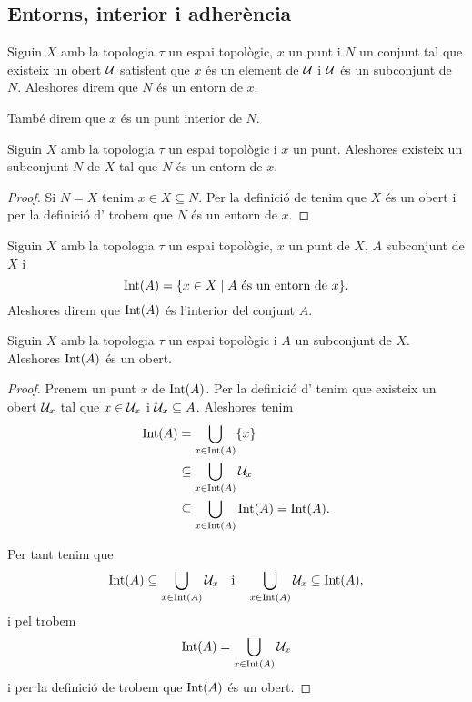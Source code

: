 \documentclass[../Apunts.tex]{subfiles}
\begin{document}
	\subsection{Entorns, interior i adherència}
	\begin{definition}[Entorn]
		\label{def:entorn}
		\label{def:punt interior}
		Siguin \(X\) amb la topologia \(\tau\) un espai topològic, \(x\) un punt i \(N\) un conjunt tal que existeix un obert \(\mathcal{U}\) satisfent que \(x\) és un element de \(\mathcal{U}\) i \(\mathcal{U}\) és un subconjunt de \(N\). Aleshores direm que \(N\) és un entorn de \(x\).
		
		També direm que \(x\) és un punt interior de \(N\).
	\end{definition}
	\begin{observation}
		\label{obs:tot punt té un entorn}
		Siguin \(X\) amb la topologia \(\tau\) un espai topològic i \(x\) un punt. Aleshores existeix un subconjunt \(N\) de \(X\) tal que \(N\) és un entorn de \(x\).
		\begin{proof}
			Si \(N=X\) tenim \(x\in X\subseteq N\). Per la definició de  tenim que \(X\) és un obert i per la definició d' trobem que \(N\) és un entorn de \(x\).
		\end{proof}
	\end{observation}
	\begin{definition}[Interior]
		\label{def:interior}
		Siguin \(X\) amb la topologia \(\tau\) un espai topològic, \(x\) un punt de \(X\), \(A\) subconjunt de \(X\) i
		\[\operatorname{Int}(A)=\{x\in X\mid A\text{ és un entorn de }x\}.\]
		Aleshores direm que \(\operatorname{Int}(A)\) és l'interior del conjunt \(A\).
	\end{definition}
	\begin{proposition}
		\label{prop:l'interior d'un conjunt és un obert}
		Siguin \(X\) amb la topologia \(\tau\) un espai topològic i \(A\) un subconjunt de \(X\). Aleshores \(\operatorname{Int}(A)\) és un obert.
		\begin{proof}
			Prenem un punt \(x\) de \(\operatorname{Int}(A)\). Per la definició d' tenim que existeix un obert \(\mathcal{U}_{x}\) tal que \(x\in\mathcal{U}_{x}\) i \(\mathcal{U}_{x}\subseteq A\). Aleshores tenim
			\begin{align*}
				\operatorname{Int}(A)&=\bigcup_{x\in\operatorname{Int}(A)}\{x\} \\
				&\subseteq\bigcup_{x\in\operatorname{Int}(A)}\mathcal{U}_{x} \\
				&\subseteq\bigcup_{x\in\operatorname{Int}(A)}\operatorname{Int}(A)=\operatorname{Int}(A).
			\end{align*}
			
			Per tant tenim que
			\[\operatorname{Int}(A)\subseteq\bigcup_{x\in\operatorname{Int}(A)}\mathcal{U}_{x}\quad\text{i}\quad\bigcup_{x\in\operatorname{Int}(A)}\mathcal{U}_{x}\subseteq\operatorname{Int}(A),\]
			i pel  trobem
			\[\operatorname{Int}(A)=\bigcup_{x\in\operatorname{Int}(A)}\mathcal{U}_{x}\]
			i per la definició de  trobem que \(\operatorname{Int}(A)\) és un obert.
		\end{proof}
	\end{proposition}
\end{document}
